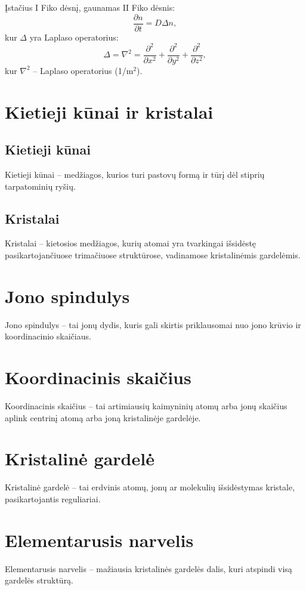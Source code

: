 \documentclass[a4paper,12pt]{article}
\begin{document}
Įstačius I Fiko dėsnį, gaunamas II Fiko dėsnis:
\[
\frac{\partial n}{\partial t} = D \Delta n,
\]
kur $\Delta$ yra Laplaso operatorius:
\[
\Delta = \nabla^2 = \frac{\partial^2}{\partial x^2} + \frac{\partial^2}{\partial y^2} + \frac{\partial^2}{\partial z^2},
\]
kur $\nabla^2$ – Laplaso operatorius (1/m\(^2\)).

\section{Kietieji kūnai ir kristalai}

\subsection{Kietieji kūnai}
Kietieji kūnai – medžiagos, kurios turi pastovų formą ir tūrį dėl stiprių tarpatominių ryšių.

\subsection{Kristalai}
Kristalai – kietosios medžiagos, kurių atomai yra tvarkingai išsidėstę pasikartojančiuose trimačiuose struktūrose, vadinamose kristalinėmis gardelėmis.

\section{Jono spindulys}
Jono spindulys – tai jonų dydis, kuris gali skirtis priklausomai nuo jono krūvio ir koordinacinio skaičiaus.

\section{Koordinacinis skaičius}
Koordinacinis skaičius – tai artimiausių kaimyninių atomų arba jonų skaičius aplink centrinį atomą arba joną kristalinėje gardelėje.

\section{Kristalinė gardelė}
Kristalinė gardelė – tai erdvinis atomų, jonų ar molekulių išsidėstymas kristale, pasikartojantis reguliariai.

\section{Elementarusis narvelis}
Elementarusis narvelis – mažiausia kristalinės gardelės dalis, kuri atspindi visą gardelės struktūrą.
\end{document}
